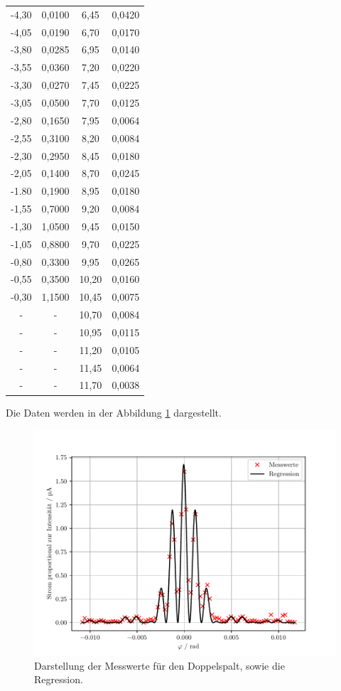 \begin{table}[H]
\begin{tabular}{c c c c}
    -4,30 & 0,0100 & 6,45 & 0,0420\\
    -4,05 & 0,0190 & 6,70 & 0,0170\\
    -3,80 & 0,0285 & 6,95 & 0,0140\\
    -3,55 & 0,0360 & 7,20 & 0,0220\\
    -3,30 & 0,0270 & 7,45 & 0,0225\\
    -3,05 & 0,0500 & 7,70 & 0,0125\\
    -2,80 & 0,1650 & 7,95 & 0,0064\\
    -2,55 & 0,3100 & 8,20 & 0,0084\\
    -2,30 & 0,2950 & 8,45 & 0,0180\\
    -2,05 & 0,1400 & 8,70 & 0,0245\\
    -1.80 & 0,1900 & 8,95 & 0,0180\\
    -1,55 & 0,7000 & 9,20 & 0,0084\\
    -1,30 & 1,0500 & 9,45 & 0,0150\\
    -1,05 & 0,8800 & 9,70 & 0,0225\\
    -0,80 & 0,3300 & 9,95 & 0,0265\\
    -0,55 & 0,3500 & 10,20& 0,0160\\
    -0,30 & 1,1500 & 10,45& 0,0075\\
        - &   -    & 10,70& 0,0084\\
        - &   -    & 10,95& 0,0115\\
        - &   -    & 11,20& 0,0105\\
        - &   -    & 11,45& 0,0064\\
        - &   -    & 11,70& 0,0038\\
    \bottomrule
  \end{tabular}
\end{table}
Die Daten werden in der Abbildung \ref{abb:6} dargestellt.

\begin{figure}[H]
  \centering
  \includegraphics{plot3.pdf}
  \caption{Darstellung der Messwerte für den Doppelspalt, sowie die Regression.}
  \label{abb:6}
\end{figure}

